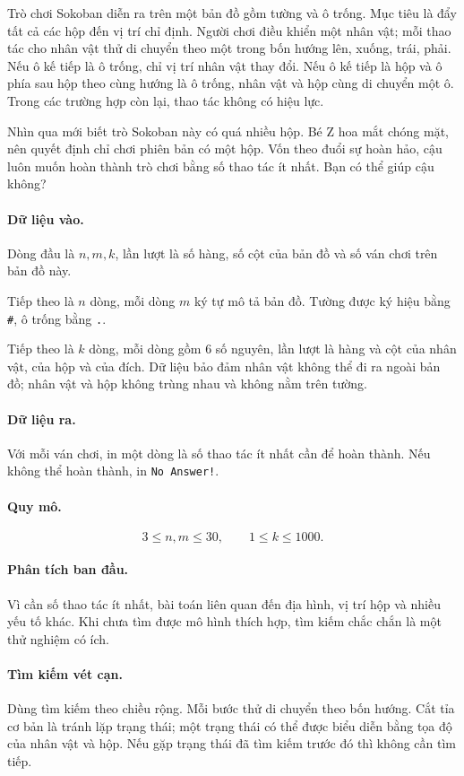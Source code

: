 \documentclass[11pt]{article}
\begin{document}
Trò chơi Sokoban diễn ra trên một bản đồ gồm tường và ô trống. Mục tiêu là đẩy
tất cả các hộp đến vị trí chỉ định. Người chơi điều khiển một nhân vật; mỗi
thao tác cho nhân vật thử di chuyển theo một trong bốn hướng lên, xuống, trái,
phải. Nếu ô kế tiếp là ô trống, chỉ vị trí nhân vật thay đổi. Nếu ô kế tiếp là
hộp và ô phía sau hộp theo cùng hướng là ô trống, nhân vật và hộp cùng di
chuyển một ô. Trong các trường hợp còn lại, thao tác không có hiệu lực.

Nhìn qua mới biết trò Sokoban này có quá nhiều hộp. Bé Z hoa mắt chóng mặt,
nên quyết định chỉ chơi phiên bản có một hộp. Vốn theo đuổi sự hoàn hảo, cậu
luôn muốn hoàn thành trò chơi bằng số thao tác ít nhất. Bạn có thể giúp cậu
không?

\paragraph{Dữ liệu vào.}
Dòng đầu là \(n,m,k\), lần lượt là số hàng, số cột của bản đồ và số ván chơi
trên bản đồ này.

Tiếp theo là \(n\) dòng, mỗi dòng \(m\) ký tự mô tả bản đồ. Tường được ký hiệu
bằng \texttt{\#}, ô trống bằng \texttt{.}.

Tiếp theo là \(k\) dòng, mỗi dòng gồm \(6\) số nguyên, lần lượt là hàng và cột
của nhân vật, của hộp và của đích. Dữ liệu bảo đảm nhân vật không thể đi ra
ngoài bản đồ; nhân vật và hộp không trùng nhau và không nằm trên tường.

\paragraph{Dữ liệu ra.}
Với mỗi ván chơi, in một dòng là số thao tác ít nhất cần để hoàn thành. Nếu
không thể hoàn thành, in \texttt{No Answer!}.

\paragraph{Quy mô.}
\[
  3\le n,m\le 30,\qquad 1\le k\le 1000.
\]

\paragraph{Phân tích ban đầu.}
Vì cần số thao tác ít nhất, bài toán liên quan đến địa hình, vị trí hộp và
nhiều yếu tố khác. Khi chưa tìm được mô hình thích hợp, tìm kiếm chắc chắn là
một thử nghiệm có ích.

\paragraph{Tìm kiếm vét cạn.}
Dùng tìm kiếm theo chiều rộng. Mỗi bước thử di chuyển theo bốn hướng. Cắt tỉa
cơ bản là tránh lặp trạng thái; một trạng thái có thể được biểu diễn bằng tọa
độ của nhân vật và hộp. Nếu gặp trạng thái đã tìm kiếm trước đó thì không cần
tìm tiếp.
\end{document}
